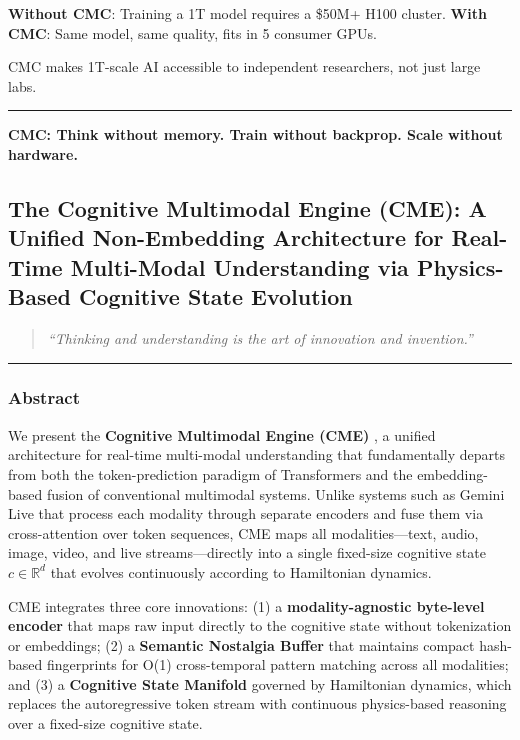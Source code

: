 \documentclass[
  11pt,
  a4paper,
]{article}
\begin{document}
\textbf{Without CMC}: Training a 1T model requires a \$50M+ H100
cluster. \textbf{With CMC}: Same model, same quality, fits in 5 consumer
GPUs.

CMC makes 1T-scale AI accessible to independent researchers, not just
large labs.

\begin{center}\rule{0.5\linewidth}{0.5pt}\end{center}

\textbf{CMC: Think without memory. Train without backprop. Scale without
hardware.}

\newpage

\subsection{The Cognitive Multimodal Engine (CME): A Unified
Non-Embedding Architecture for Real-Time Multi-Modal Understanding via
Physics-Based Cognitive State
Evolution}\label{the-cognitive-multimodal-engine-cme-a-unified-non-embedding-architecture-for-real-time-multi-modal-understanding-via-physics-based-cognitive-state-evolution}

\begin{quote}
\emph{``Thinking and understanding is the art of innovation and
invention.''}
\end{quote}

\begin{center}\rule{0.5\linewidth}{0.5pt}\end{center}

\subsubsection{Abstract}\label{abstract-5}

We present the \textbf{Cognitive Multimodal Engine (CME)} , a unified
architecture for real-time multi-modal understanding that fundamentally
departs from both the token-prediction paradigm of Transformers and the
embedding-based fusion of conventional multimodal systems. Unlike
systems such as Gemini Live that process each modality through separate
encoders and fuse them via cross-attention over token sequences, CME
maps all modalities---text, audio, image, video, and live
streams---directly into a single fixed-size cognitive state
\(c \in \mathbb{R}^{d}\) that evolves continuously according to
Hamiltonian dynamics.

CME integrates three core innovations: (1) a \textbf{modality-agnostic
byte-level encoder} that maps raw input directly to the cognitive state
without tokenization or embeddings; (2) a \textbf{Semantic Nostalgia
Buffer} that maintains compact hash-based fingerprints for O(1)
cross-temporal pattern matching across all modalities; and (3) a
\textbf{Cognitive State Manifold} governed by Hamiltonian dynamics,
which replaces the autoregressive token stream with continuous
physics-based reasoning over a fixed-size cognitive state.
\end{document}
